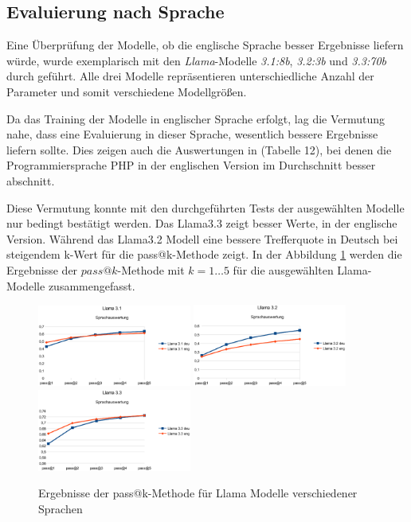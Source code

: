 \subsection{Evaluierung nach Sprache}
Eine Überprüfung der Modelle, ob die englische Sprache besser Ergebnisse liefern würde, wurde exemplarisch mit den \textit{Llama}-Modelle \textit{3.1:8b}, \textit{3.2:3b} und \textit{3.3:70b} durch geführt. Alle drei Modelle repräsentieren unterschiedliche Anzahl der Parameter und somit verschiedene Modellgrößen.\vspace{0.2cm}

Da das Training der Modelle in englischer Sprache erfolgt, lag die Vermutung nahe, dass eine Evaluierung in dieser Sprache, wesentlich bessere Ergebnisse liefern sollte. Dies zeigen auch die Auswertungen in \cite[][11]{peng-2024} (Tabelle 12), bei denen die Programmiersprache PHP in der englischen Version im Durchschnitt besser abschnitt.\vspace{0.2cm}

Diese Vermutung konnte mit den durchgeführten Tests der ausgewählten Modelle nur bedingt bestätigt werden. Das Llama3.3 zeigt besser Werte, in der englische Version. Während das Llama3.2 Modell eine bessere Trefferquote in Deutsch bei steigendem k-Wert für die pass@k-Methode zeigt. In der Abbildung \ref{img:pass_at_k_results_by_llama_lang} werden die Ergebnisse der $pass@k$-Methode mit $k=1 … 5$ für die ausgewählten Llama-Modelle zusammengefasst.\vspace{0.2cm}

\begin{figure}[!ht]
	\includegraphics[width=0.45\textwidth]{content/chapter_evaluation/images/llama31_evaluation_lang.eps}
	\includegraphics[width=0.45\textwidth]{content/chapter_evaluation/images/llama32_evaluation_lang.eps}
	\includegraphics[width=0.45\textwidth]{content/chapter_evaluation/images/llama33_evaluation_lang.eps}
	\caption{Ergebnisse der pass@k-Methode für Llama Modelle verschiedener Sprachen}
	\label{img:pass_at_k_results_by_llama_lang}
\end{figure}

